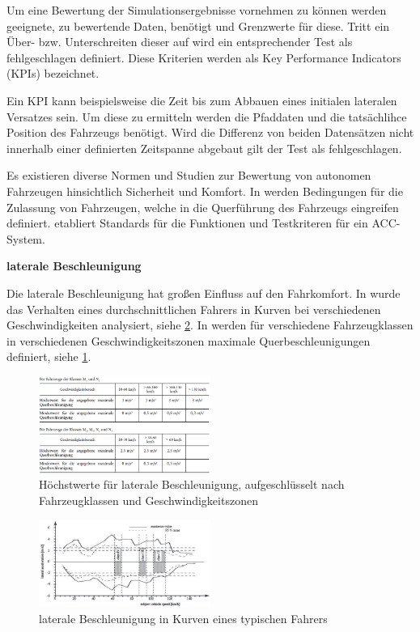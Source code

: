 Um eine Bewertung der Simulationsergebnisse vornehmen zu können werden geeignete, zu bewertende Daten, benötigt und Grenzwerte für diese. Tritt ein Über- bzw. Unterschreiten dieser auf wird ein entsprechender Test als fehlgeschlagen definiert. Diese Kriterien werden als Key Performance Indicators (KPIs) bezeichnet.

Ein KPI kann beispielsweise die Zeit bis zum Abbauen eines initialen lateralen Versatzes sein. Um diese zu ermitteln werden die Pfaddaten und die tatsächlihce Position des Fahrzeugs benötigt. Wird die Differenz von beiden Datensätzen nicht innerhalb einer definierten Zeitspanne abgebaut gilt der Test als fehlgeschlagen.

Es existieren diverse Normen und Studien zur Bewertung von autonomen Fahrzeugen hinsichtlich Sicherheit und Komfort. In \cite{UNECE_R79} werden Bedingungen für die Zulassung von Fahrzeugen, welche in die Querführung des Fahrzeugs eingreifen definiert. \cite{ISO15622} etabliert Standards für die Funktionen und Testkriteren für ein ACC-System.

\bigskip\noindent\textbf{laterale Beschleunigung}

\noindent Die laterale Beschleunigung hat großen Einfluss auf den Fahrkomfort. In \cite{ISO15622} wurde das Verhalten eines durchschnittlichen Fahrers in Kurven bei verschiedenen Geschwindigkeiten analysiert, siehe \ref{fig:lateral_acceleration}. In \cite{UNECE_R79} werden für verschiedene Fahrzeugklassen in verschiedenen Geschwindigkeitszonen maximale Querbeschleunigungen definiert, siehe \ref{fig:lateral_acceleration_unece}.
\begin{figure}
    \centering
    \includegraphics[width=0.5\textwidth]{figures/3_Implementierung/querbechleunigung_unece.png}
    \caption{Höchstwerte für laterale Beschleunigung, aufgeschlüsselt nach Fahrzeugklassen und Geschwindigkeitszonen \cite{UNECE_R79}}
    \label{fig:lateral_acceleration_unece}
\end{figure}
\begin{figure}
    \centering
    \includegraphics[width=0.5\textwidth]{figures/3_Implementierung/lateral_acceleration.png}
    \caption{laterale Beschleunigung in Kurven eines typischen Fahrers \cite{ISO15622}}
    \label{fig:lateral_acceleration}
\end{figure}

